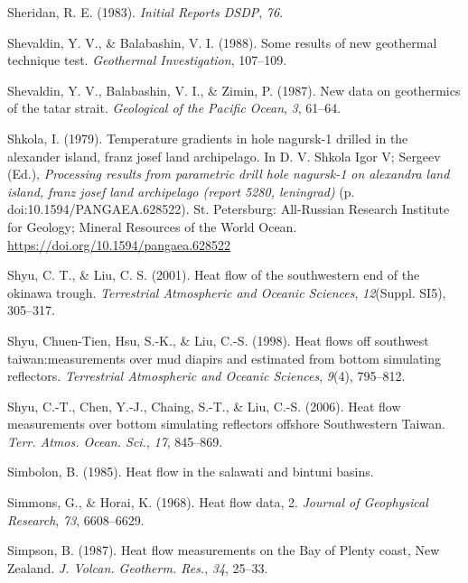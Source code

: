 \documentclass[draft,linenumbers]{agujournal2018}
\begin{document}
\leavevmode{}%
Sheridan, R. E. (1983). \emph{Initial Reports DSDP}, \emph{76}.

\leavevmode{}%
Shevaldin, Y. V., \& Balabashin, V. I. (1988). Some results of new
geothermal technique test. \emph{Geothermal Investigation}, 107--109.

\leavevmode{}%
Shevaldin, Y. V., Balabashin, V. I., \& Zimin, P. (1987). New data on
geothermics of the tatar strait. \emph{Geological of the Pacific Ocean},
\emph{3}, 61--64.

\leavevmode{}%
Shkola, I. (1979). Temperature gradients in hole nagursk-1 drilled in
the alexander island, franz josef land archipelago. In D. V. Shkola Igor
V; Sergeev (Ed.), \emph{Processing results from parametric drill hole
nagursk-1 on alexandra land island, franz josef land archipelago (report
5280, leningrad)} (p. doi:10.1594/PANGAEA.628522). St. Petersburg:
All-Russian Research Institute for Geology; Mineral Resources of the
World Ocean. \url{https://doi.org/10.1594/pangaea.628522}

\leavevmode{}%
Shyu, C. T., \& Liu, C. S. (2001). Heat flow of the southwestern end of
the okinawa trough. \emph{Terrestrial Atmospheric and Oceanic Sciences},
\emph{12}(Suppl. SI5), 305--317.

\leavevmode{}%
Shyu, Chuen-Tien, Hsu, S.-K., \& Liu, C.-S. (1998). Heat flows off
southwest taiwan:measurements over mud diapirs and estimated from bottom
simulating reflectors. \emph{Terrestrial Atmospheric and Oceanic
Sciences}, \emph{9}(4), 795--812.

\leavevmode{}%
Shyu, C.-T., Chen, Y.-J., Chaing, S.-T., \& Liu, C.-S. (2006). Heat flow
measurements over bottom simulating reflectors offshore {Southwestern
Taiwan}. \emph{Terr. Atmos. Ocean. Sci.}, \emph{17}, 845--869.

\leavevmode{}%
Simbolon, B. (1985). Heat flow in the salawati and bintuni basins.

\leavevmode{}%
Simmons, G., \& Horai, K. (1968). Heat flow data, 2. \emph{Journal of
Geophysical Research}, \emph{73}, 6608--6629.

\leavevmode{}%
Simpson, B. (1987). Heat flow measurements on the {Bay of Plenty} coast,
{New Zealand}. \emph{J. Volcan. Geotherm. Res.}, \emph{34}, 25--33.
\end{document}
